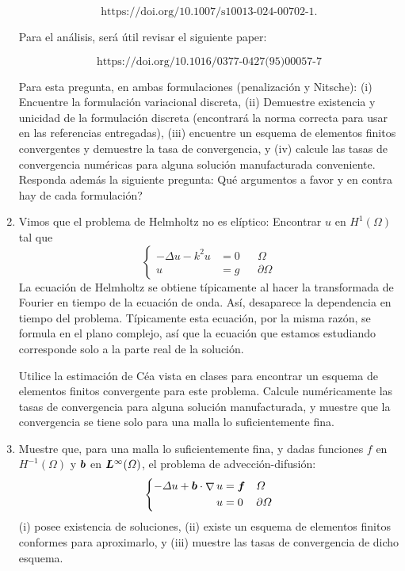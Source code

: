 \documentclass{article}
\renewcommand{\vec}{\vectorsym}
\DeclareMathOperator{\grad}{\nabla}
\begin{document}
\begin{enumerate}
    $$ \text{https://doi.org/10.1007/s10013-024-00702-1}. $$
   
    Para el análisis, será útil revisar el siguiente paper: 

    $$ \text{https://doi.org/10.1016/0377-0427(95)00057-7} $$

    Para esta pregunta, en ambas formulaciones (penalización y Nitsche): (i) Encuentre la formulación variacional discreta, (ii) Demuestre existencia y unicidad de la formulación discreta (encontrará la norma correcta para usar en las referencias entregadas), (iii) encuentre un esquema de elementos finitos convergentes y demuestre la tasa de convergencia, y (iv) calcule las tasas de convergencia numéricas para alguna solución manufacturada conveniente. Responda además la siguiente pregunta: Qué argumentos a favor y en contra hay de cada formulación? 

    \item Vimos que el problema de Helmholtz no es elíptico: Encontrar $u$ en $H^1(\Omega)$ tal que 
        $$
        \left\{\begin{aligned}
             -\Delta u - k^2 u&= 0 &&\Omega \\
            u &= g &&\partial\Omega
        \end{aligned}\right.
        $$
        La ecuación de Helmholtz se obtiene típicamente al hacer la transformada de Fourier en tiempo de la ecuación de onda. Así, desaparece la dependencia en tiempo del problema. Típicamente esta ecuación, por la misma razón, se formula en el plano complejo, así que la ecuación que estamos estudiando corresponde solo a la parte real de la solución. 

        Utilice la estimación de Céa vista en clases para encontrar un esquema de elementos finitos convergente para este problema. Calcule numéricamente las tasas de convergencia para alguna solución manufacturada, y muestre que la convergencia se tiene solo para una malla lo suficientemente fina. 
        

    \item Muestre que, para una malla lo suficientemente fina, y dadas funciones $f$ en $H^{-1}(\Omega)$ y $\vec b$ en $\vec L^\infty(\Omega)$, el problema de advección-difusión: 
         $$
        \left\{\begin{aligned}
             -\Delta u + \vec b\cdot \grad u &= \vec f &&\Omega \\
            u &= 0 &&\partial\Omega
        \end{aligned}\right.
        $$
        (i) posee existencia de soluciones, (ii) existe un esquema de elementos finitos conformes para aproximarlo, y (iii) muestre las tasas de convergencia de dicho esquema. 
   
\end{enumerate}

\end{document}
